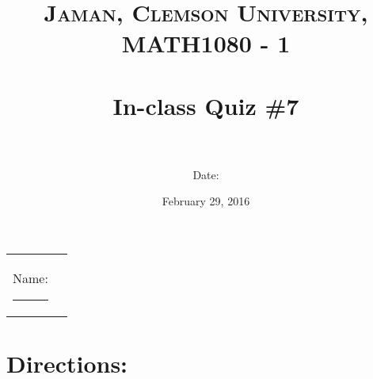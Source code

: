\documentclass[paper=a4, fontsize=11pt]{scrartcl} %
\title{	
\normalfont \normalsize 
\textsc{Jaman, Clemson University, MATH1080 - 1} \\ [25pt] %
\horrule{0.5pt} \\[0.4cm] %
\huge In-class Quiz \#7 \\ %
\horrule{2pt} \\[0.5cm] %
}
\author{Date:} %
\date{\normalsize February 29, 2016} %
\numberwithin{equation}{section} %
\numberwithin{figure}{section} %
\numberwithin{table}{section} %
\begin{document}
\maketitle %

\begin{flushleft}
\begin{tabular}{l l}
Name: \rule{3.2in}{.01cm}  & {}%
\end{tabular}
\end{flushleft}


\section*{\textbf{Directions:}}
\end{document}
